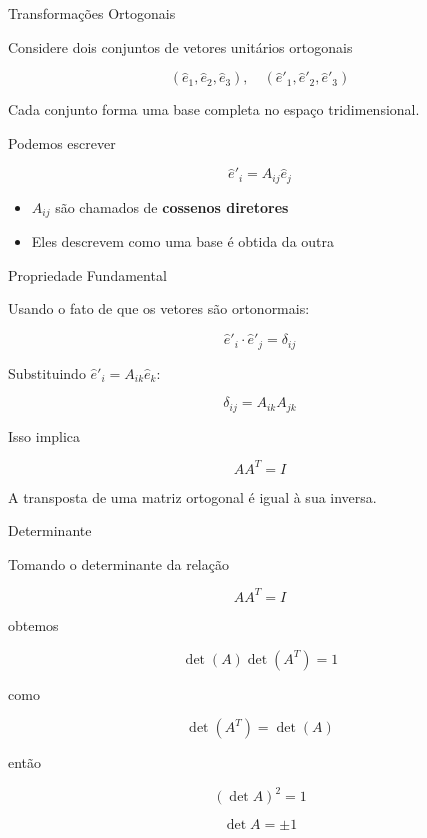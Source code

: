 \documentclass[aspectratio=169]{beamer}
\begin{document}
\begin{frame}{Transformações Ortogonais}

Considere dois conjuntos de vetores unitários ortogonais

\[
(\hat e_1,\hat e_2,\hat e_3), \quad
(\hat e'_1,\hat e'_2,\hat e'_3)
\]

Cada conjunto forma uma base completa no espaço tridimensional.

Podemos escrever

\begin{equation}
\hat e'_i = A_{ij}\hat e_j
\end{equation}

\begin{itemize}
\item $A_{ij}$ são chamados de \textbf{cossenos diretores}
\item Eles descrevem como uma base é obtida da outra
\end{itemize}

\end{frame}

\begin{frame}{Propriedade Fundamental}

Usando o fato de que os vetores são ortonormais:

\[
\hat e'_i \cdot \hat e'_j = \delta_{ij}
\]

Substituindo $\hat e'_i = A_{ik}\hat e_k$:

\begin{equation}
\delta_{ij}=A_{ik}A_{jk}
\end{equation}

Isso implica

\begin{equation}
AA^T = I
\end{equation}

\begin{tcolorbox}[colback=blue!5,colframe=blue]
A transposta de uma matriz ortogonal é igual à sua inversa.
\end{tcolorbox}

\end{frame}

\begin{frame}{Determinante}

Tomando o determinante da relação

\[
AA^T = I
\]

obtemos

\[
\det(A)\det(A^T)=1
\]

como

\[
\det(A^T)=\det(A)
\]

então

\begin{equation}
(\det A)^2=1
\end{equation}

\[
\det A=\pm1
\]

\end{frame}
\end{document}
